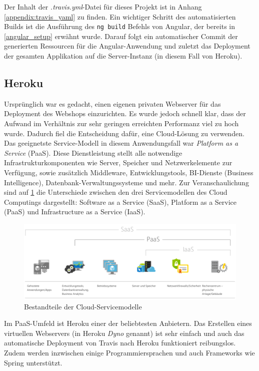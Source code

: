 Der Inhalt der \textit{.travis.yml}-Datei für dieses Projekt ist in Anhang \ref{appendix:travis_yaml} zu finden. Ein wichtiger Schritt des automatisierten Builds ist die Ausführung des \texttt{ng build} Befehls von Angular, der bereits in \cref{angular_setup} erwähnt wurde. Darauf folgt ein automatischer Commit der generierten Ressourcen für die Angular-Anwendung und zuletzt das Deployment der gesamten Applikation auf die Server-Instanz (in diesem Fall von Heroku).

\subsection{Heroku}
Ursprünglich war es gedacht, einen eigenen privaten Webserver für das Deployment des Webshops einzurichten. Es wurde jedoch schnell klar, dass der Aufwand im Verhältnis zur sehr geringen erreichten Performanz viel zu hoch wurde. Dadurch fiel die Entscheidung dafür, eine Cloud-Lösung zu verwenden. Das geeignetste Service-Modell in diesem Anwendungsfall war \textit{Platform as a Service} (PaaS). Diese Dienstleistung stellt alle notwendige Infrastrukturkomponenten wie Server, Speicher und Netzwerkelemente zur Verfügung, sowie zusätzlich Middleware, Entwicklungstools, BI-Dienste (Business Intelligence), Datenbank-Verwaltungssysteme und mehr\cite{Azure2017}. Zur Veranschaulichung sind auf \cref{fig:cloud} die Unterschiede zwischen den drei Servicemodellen des Cloud Computings dargestellt: Software as a Service (SaaS), Platform as a Service (PaaS) und Infrastructure as a Service (IaaS).

\begin{figure}[th!]
	\centering
	\includegraphics[width=\linewidth]{bilder/kap8/cloud}
	\caption[Bestandteile der Cloud-Servicemodelle]{Bestandteile der Cloud-Servicemodelle\cite{Azure2017}}
	\label{fig:cloud}
\end{figure}

Im PaaS-Umfeld ist Heroku einer der beliebtesten Anbietern. Das Erstellen eines virtuellen Webservers (in Heroku \textit{Dyno} genannt) ist sehr einfach und auch das automatische Deployment von Travis nach Heroku funktioniert reibungslos. Zudem werden inzwischen einige Programmiersprachen und auch Frameworks wie Spring unterstützt\cite{Coutermarsh2014}.

